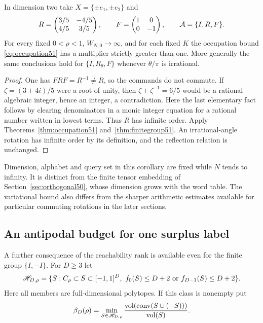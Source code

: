 \begin{corollary}
\label{cor:rational51}
In dimension two take $X=\{\pm e_1,\pm e_2\}$ and
\[
 R=\begin{pmatrix}3/5&-4/5\\4/5&3/5\end{pmatrix},\qquad
 F=\begin{pmatrix}1&0\\0&-1\end{pmatrix},\qquad
 \mathcal A=\{I,R,F\}.
\]
For every fixed $0<\rho<1$, $W_{N,0}\to\infty$, and for each
fixed $K$ the occupation bound \eqref{eq:occupation51} has a multiplier
strictly greater than one. More generally the same conclusions hold
for $\{I,R_\theta,F\}$ whenever $\theta/\pi$ is irrational.
\end{corollary}
\begin{proof}
One has $FRF=R^{-1}\ne R$, so the commands do not commute. If
$\zeta=(3+4i)/5$ were a root of unity, then
$\zeta+\zeta^{-1}=6/5$ would be a rational algebraic integer,
hence an integer, a contradiction. Here the last elementary fact
follows by clearing denominators in a monic integer equation for a
rational number written in lowest terms. Thus $R$ has infinite order.
Apply Theorems~\ref{thm:occupation51} and~\ref{thm:finitegroup51}.
An irrational-angle rotation has infinite order by its definition,
and the reflection relation is unchanged.
\end{proof}

Dimension, alphabet and query set in this corollary are fixed while
$N$ tends to infinity. It is distinct from the finite tensor embedding
of Section~\ref{sec:orthogonal50}, whose dimension grows with the
word table. The variational bound also differs from the sharper
arithmetic estimates available for particular commuting rotations in
the later sections.

\subsection{An antipodal budget for one surplus label}
A further consequence of the reachability rank is available even for
the finite group $\{I,-I\}$. For $D\ge3$ let
\[
 \mathscr H_{D,\rho}=\{S:C_\rho\subset S\subset[-1,1]^D,
       \ f_0(S)\le D+2\ \hbox{or}\ f_{D-1}(S)\le D+2\}.
\]
Here all members are full-dimensional polytopes. If this class is
nonempty put
\begin{equation}\label{eq:antipodal51}
 \beta_D(\rho)=\min_{S\in\mathscr H_{D,\rho}}
       \frac{\operatorname{vol}(\operatorname{conv}(S\cup(-S)))}
            {\operatorname{vol}(S)}.
\end{equation}

